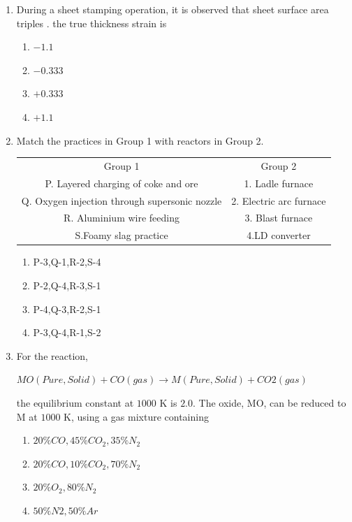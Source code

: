 \documentclass[journal]{IEEEtran}
\theoremstyle{remark}
\begin{document}
\begin{enumerate}
\item During a sheet stamping operation, it is observed that sheet surface area triples . the true thickness strain is  \hfill{}
\begin{multicols}{4}
\begin{enumerate}
\item $-1.1$
\item $-0.333$
\item $+0.333$
\item $+1.1$
\end{enumerate}
\end{multicols}
\item Match the practices in Group 1 with reactors in Group 2.\hfill{}
\begin{center}
\begin{tabular}{c c}
Group 1     &  Group 2\\
P. Layered charging of coke and ore     &1. Ladle furnace\\
Q. Oxygen injection through supersonic nozzle &2. Electric arc furnace\\ 
R. Aluminium wire feeding &3. Blast furnace\\
S.Foamy slag practice & 4.LD converter
\end{tabular}
\end{center}
\begin{multicols}{2}
\begin{enumerate}
\item P-3,Q-1,R-2,S-4
\item P-2,Q-4,R-3,S-1
\item P-4,Q-3,R-2,S-1
\item P-3,Q-4,R-1,S-2
\end{enumerate}
\end{multicols}

\item For the reaction,\\
\begin{center}
    
$MO(Pure, Solid) + CO(gas) \longrightarrow M(Pure, Solid) + CO2 (gas)$\\
\end{center}
the equilibrium constant at $1000$ K is $2.0$. The oxide, MO, can be reduced to M at $1000$ K, using a gas
mixture containing
\hfill{}
\begin{multicols}{2}
\begin{enumerate}
\item $20\% CO , 45\% CO_2, 35\% N_2$
\item  $20\% CO, 10\% CO_2, 70\% N_2$
\item$20\% O_2, 80\% N_2$
\item $50\% N2, 50\%Ar$
\end{enumerate}
\end{multicols}


\end{enumerate}
\end{document}
